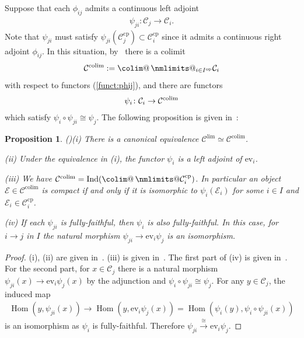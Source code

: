 \documentclass [11pt,oneside,a4paper,mathscr]{amsart}
\makeatletter
\newtheorem{prop}[thm]{Proposition}
\theoremstyle{definition}
\newcommand{\Ind}{\operatorname{Ind}}
\newcommand{\Hom}{\operatorname{Hom}}
\newcommand{\colim@}[2]{%
  \vtop{\m@th\ialign{##\cr
    \hfil$#1\operator@font colim$\hfil\cr
    \noalign{\nointerlineskip\kern1.5\ex@}#2\cr
    \noalign{\nointerlineskip\kern-\ex@}\cr}}%
}
\newcommand{\colim}{%
  \mathop{\mathpalette\colim@{}}\nmlimits@
}
\makeatother
\begin{document}
Suppose that each $\phi_{ij}$ admits a continuous left adjoint 
\begin{align}\label{funct:phij}
\psi_{ji} \colon \mathcal{C}_j \to \mathcal{C}_i.     
\end{align}
Note that $\psi_{ji}$ must satisfy $\psi_{ji}(\mathcal{C}_j^{\mathrm{cp}}) \subset 
\mathcal{C}_i^{\mathrm{cp}}$
since it admits a continuous right adjoint $\phi_{ij}$. In this 
situation, by~\cite[Proposition~1.7.5]{DGbun}
there is a colimit 
\begin{align*}
    \mathcal{C}^{\mathrm{colim}}:=\colim_{i\in I^{\mathrm{op}}}\mathcal{C}_i
\end{align*}
with respect to functors (\ref{funct:phij}), and 
there are functors
\begin{align}\notag
\psi_i \colon \mathcal{C}_i \to \mathcal{C}^{\mathrm{colim}}
\end{align}
which satisfy
$\psi_i \circ \psi_{ji} \cong \psi_j$. 
The following proposition is given in~\cite{DGbun}: 
\begin{prop}\emph{(\cite{DGbun})}\label{prop:dgcat}
 (i) There is a canonical equivalence $\mathcal{C}^{\mathrm{lim}} \simeq \mathcal{C}^{\mathrm{colim}}$. 

 (ii) Under the equivalence in (i), the functor $\psi_i$ is a left adjoint of $\mathrm{ev}_i$. 

 (iii) We have 
 $\mathcal{C}^{\mathrm{colim}}=\Ind(\colim \mathcal{C}_i^{\mathrm{cp}})$. In particular 
 an object $\mathcal{E} \in \mathcal{C}^{\mathrm{colim}}$ is compact if and only 
 if it is isomorphic to $\psi_i(\mathcal{E}_i)$ for some $i\in I$ and 
 $\mathcal{E}_i \in \mathcal{C}_i^{\mathrm{cp}}$. 

 (iv) If each $\psi_{ji}$ is fully-faithful, then $\psi_i$ is also fully-faithful. 
 In this case, for $i \to j$ in $I$ 
 the natural morphism $\psi_{ji} \to \mathrm{ev}_i \psi_j$ is an isomorphism. \end{prop}
\begin{proof}
    (i), (ii) are given in~\cite[Proposition~1.7.5]{DGbun}. 
    (iii) is given in~\cite[Corollary~1.9.4]{DGbun}. The first part of (iv) is given in~\cite[Remark~1.7.6]{DGbun}. For the second part, 
    for $x \in \mathcal{C}_j$ there is a natural morphism 
    $\psi_{ji}(x) \to \mathrm{ev}_i\psi_j(x)$ by the adjunction 
    and $\psi_i \circ \psi_{ji} \cong \psi_j$. 
    For any $y \in \mathcal{C}_j$, the induced map 
    \begin{align*}
        \Hom(y, \psi_{ji}(x)) \to \Hom(y, \mathrm{ev}_i \psi_j(x))=\Hom(\psi_i(y), \psi_i \circ \psi_{ji}(x))
    \end{align*}
    is an isomorphism as $\psi_i$ is fully-faithful. Therefore 
    $\psi_{ji} \stackrel{\cong}{\to} \mathrm{ev}_i \psi_j$.     
\end{proof}
\end{document}
